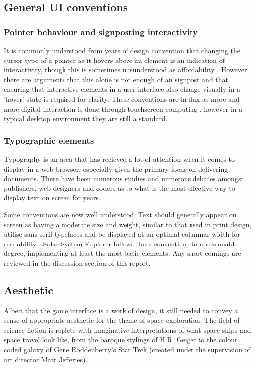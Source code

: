 \documentclass[twoside]{bhamthesis}
\begin{document}
\subsection{General UI conventions}

\subsubsection{Pointer behaviour and signposting interactivity}

It is commonly understood from years of design convention that changing the cursor type of a pointer as it hovers above an element is an indication of interactivity, though this is sometimes misunderstood as affordability \cite{norman_affordance_1999}. However there are arguments that this alone is not enough of an signpost and that ensuring that interactive elements in a user interface also change visually in a 'hover' state is required for clarity. These conventions are in flux as more and more digital interaction is done through touchscreen computing \cite{inostroza_usability_2012}, however in a typical desktop environment they are still a standard.

\subsubsection{Typographic elements}

Typography is an area that has recieved a lot of attention when it comes to display in a web browser, especially given the primary focus on delivering documents. There have been numerous studies and numerous debates amongst publishers, web designers and coders as to what is the most effective way to display text on screen for years.

Some conventions are now well understood. Text should generally appear on screen as having a moderate size and weight, similar to that used in print design, utilise sans-serif typefaces and be displayed at an optimal columnar width for readability \cite{lupton_type_2014}. Solar System Explorer follows these conventions to a reasonable degree, implementing at least the most basic elements. Any short comings are reviewed in the discussion section of this report.

\subsection{Aesthetic}

Albeit that the game interface is a work of design, it still needed to convey a sense of appropriate aesthetic for the theme of space exploration. The field of science fiction is replete with imaginative interpretations of what space ships and space travel look like, from the baroque stylings of H.R. Geiger to the colour coded galaxy of Gene Roddenberry's Star Trek (created under the supervision of art director Matt Jefferies).
\end{document}
